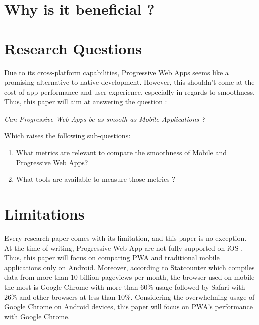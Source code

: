 \documentclass{kththesis}
\begin{document}
\section{Why is it beneficial ?}


\section{Research Questions}

Due to its cross-platform capabilities, Progressive Web Apps seems like a promising alternative to native development. However, this shouldn't come at the cost of app performance and user experience, especially in regards to smoothness.
Thus, this paper will aim at answering the question : 
\begin{center}
    \textit{Can Progressive Web Apps be as smooth as Mobile Applications ?}
\end{center}
Which raises the following sub-questions: 
\begin{enumerate}
    \item What metrics are relevant to compare the smoothness of Mobile and Progressive Web Apps?
    \item What tools are available to measure those metrics ?
\end{enumerate}

\section{Limitations}

Every research paper comes with its limitation, and this paper is no exception. 
At the time of writing, Progressive Web App are not fully supported on iOS \cite{BackgroundSync_support} \cite{Manifest_support}. Thus, this paper will focus on comparing PWA and traditional mobile applications only on Android. 
Moreover, according to Statcounter \cite{Browser_data} which compiles data from more than 10 billion pageviews per month, the browser used on mobile the most is Google Chrome with more than 60\% usage followed by Safari with 26\% and other browsers at less than 10\%. 
Considering the overwhelming usage of Google Chrome on Android devices, this paper will focus on PWA's performance with Google Chrome. 
\end{document}
